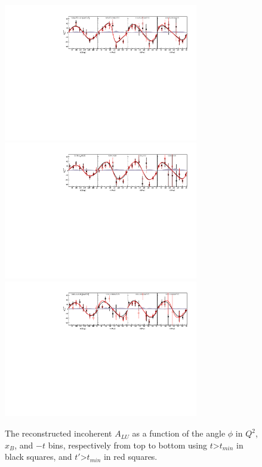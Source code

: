 \begin{figure}[h!]
   \includegraphics[height=6.0cm]{fig-incoh/ALU_phi_p_Q2.pdf}
   \includegraphics[height=6.0cm]{fig-incoh/ALU_phi_p_x.pdf}
   \includegraphics[height=6.0cm]{fig-incoh/ALU_phi_p_t.pdf}
\caption{The reconstructed incoherent $A_{LU}$ as a function of the angle 
   $\phi$ in $Q^2$, $x_B$, and $-t$ bins, respectively from top to bottom using 
$t$>$t_{min}$ in black squares, and $t'$>$t_{min}$ in red squares.}
   \label{fig:bsa_incoh_bins}
\end{figure}

